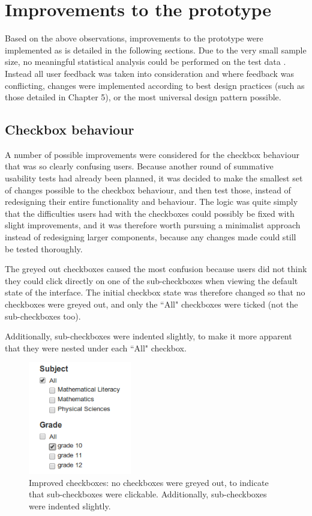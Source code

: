 \section{Improvements to the prototype}
Based on the above observations, improvements to the prototype were implemented as is detailed in the following sections. Due to the very small sample size, no meaningful statistical analysis could be performed on the test data \citep[p. 149]{Hartson}. Instead all user feedback was taken into consideration and where feedback was conflicting, changes were implemented according to best design practices (such as those detailed in Chapter 5), or the most universal design pattern possible.
\subsection{Checkbox behaviour}
A number of possible improvements were considered for the checkbox behaviour that was so clearly confusing users. Because another round of summative usability tests had already been planned, it was decided to make the smallest set of changes possible to the checkbox behaviour, and then test those, instead of redesigning their entire functionality and behaviour. The logic was quite simply that the difficulties users had with the checkboxes could possibly be fixed with slight improvements, and it was therefore worth pursuing a minimalist approach instead of redesigning larger components,  because any changes made could still be tested thoroughly.

The greyed out checkboxes caused the most confusion because users did not think they could click directly on one of the sub-checkboxes when viewing the default state of the interface. The initial checkbox state was therefore changed so that no checkboxes were greyed out, and only the ``All" checkboxes were ticked (not the sub-checkboxes too).  

Additionally, sub-checkboxes were indented slightly, to make it more apparent that they were nested under each ``All" checkbox.

\begin{figure}[h!]
    \centering
    \includegraphics[width=0.4\textwidth]{Figures/V2/checkboxes.png}
 \caption{Improved checkboxes: no checkboxes were greyed out, to indicate that sub-checkboxes were clickable. Additionally, sub-checkboxes were indented slightly.	}
\end{figure}


